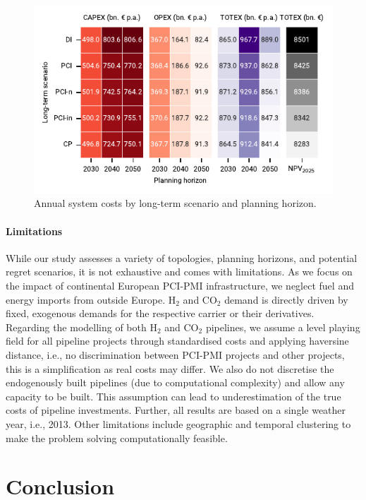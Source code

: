 \documentclass[pdflatex,sn-nature]{sn-jnl}
\theoremstyle{thmstyleone}%
\theoremstyle{thmstyletwo}%
\theoremstyle{thmstylethree}%
\begin{document}
\begin{figure}[htbp]
  \centering
  \includegraphics{figures/totex_heatmap}
  \caption{Annual system costs by long-term scenario and planning horizon.}
  \label{fig:totex_heatmap}
\end{figure}

\paragraph{Limitations}
While our study assesses a variety of topologies, planning horizons, and potential regret scenarios, it is not exhaustive and comes with limitations. As we focus on the impact of continental European PCI-PMI infrastructure, we neglect fuel and energy imports from outside Europe. H$_2$ and CO$_2$ demand is directly driven by fixed, exogenous demands for the respective carrier or their derivatives. Regarding the modelling of both H$_2$ and CO$_2$ pipelines, we assume a level playing field for all pipeline projects through standardised costs and applying haversine distance, i.e., no discrimination between PCI-PMI projects and other projects, this is a simplification as real costs may differ. We also do not discretise the endogenously built pipelines (due to computational complexity) and allow any capacity to be built. This assumption can lead to underestimation of the true costs of pipeline investments.
Further, all results are based on a single weather year, i.e., 2013.
Other limitations include geographic and temporal clustering to make the problem solving computationally feasible.


\section*{Conclusion}
\label{sec:conclusion}
\end{document}
